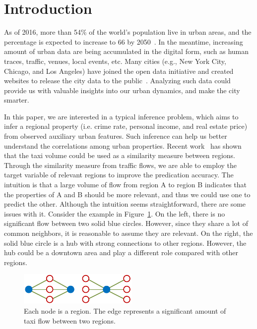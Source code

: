 \section{Introduction}

As of 2016, more than 54\% of the world's population live in urban areas, and the percentage is expected to increase to 66 by 2050~\cite{nations2014world}. In the meantime, increasing amount of urban data are being accumulated in the digital form, such as human traces, traffic, venues, local events, etc. Many cities (e.g., New York City, Chicago, and Los Angeles) have joined the open data initiative and created websites to release the city data to the public~\cite{data-taxi, nyctaxi}. Analyzing such data could provide us with valuable insights into our urban dynamics, and make the city smarter.

In this paper, we are interested in a typical inference problem, which aims to infer a regional property (i.e. crime rate, personal income, and real estate price) from observed auxiliary urban features. Such inference can help us better understand the correlations among urban properties. Recent work~\cite{wang2016crime} has shown that the taxi volume could be used as a similarity measure between regions. Through the similarity measure from traffic flows, we are able to employ the target variable of relevant regions to improve the predication accuracy. The intuition is that a large volume of flow from region A to region B indicates that the properties of A and B should be more relevant, and thus we could use one to predict the other. Although the intuition seems straightforward, there are some issues with it. Consider the example in Figure~\ref{fig:example}. On the left, there is no significant flow between two solid blue circles. However, since they share a lot of common neighbors, it is reasonable to assume they are relevant. On the right, the solid blue circle is a hub with strong connections to other regions. However, the hub could be a downtown area and play a different role compared with other regions.

\begin{figure}[h]
\centering
\includegraphics[width=0.5\linewidth]{fig/example.pdf}
\caption{Each node is a region. The edge represents a significant amount of taxi flow between two regions.}
\label{fig:example}
\end{figure}

